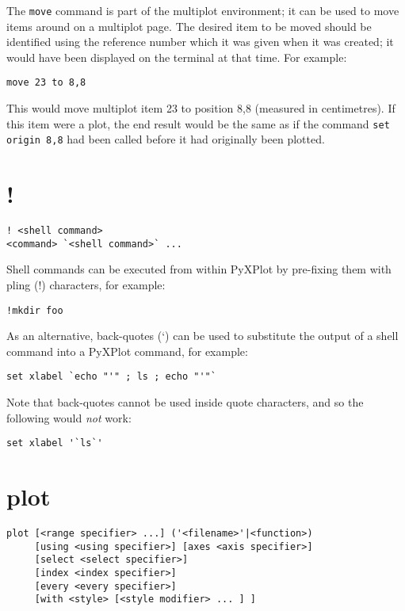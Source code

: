 The {\tt move} command is part of the multiplot environment; it can be used to
move items around on a multiplot page. The desired item to be moved should be
identified using the reference number which it was given when it was created;
it would have been displayed on the terminal at that time. For example:

\begin{verbatim}
move 23 to 8,8
\end{verbatim}
  
\noindent This would move multiplot item 23 to position 8,8 (measured in
centimetres). If this item were a plot, the end result would be the same as if
the command {\tt set origin 8,8} had been called before it had originally been
plotted.

\section{!}

\begin{verbatim}
! <shell command>
<command> `<shell command>` ...
\end{verbatim}

Shell commands can be executed from within PyXPlot by pre-fixing them with
pling (!) characters, for example:

\begin{verbatim}
!mkdir foo
\end{verbatim}

\noindent As an alternative, back-quotes (`) can be used to substitute the
output of a shell command into a PyXPlot command, for example:

\begin{verbatim}
set xlabel `echo "'" ; ls ; echo "'"`
\end{verbatim}

\noindent Note that back-quotes cannot be used inside quote characters, and so
the following would \textit{not} work:

\begin{verbatim}
set xlabel '`ls`'
\end{verbatim}


\section{plot}

\begin{verbatim}
plot [<range specifier> ...] ('<filename>'|<function>)
     [using <using specifier>] [axes <axis specifier>]
     [select <select specifier>]
     [index <index specifier>]
     [every <every specifier>]
     [with <style> [<style modifier> ... ] ]
\end{verbatim}

